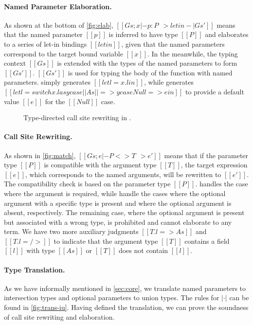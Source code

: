 \paragraph{Named Parameter Elaboration.}
As shown at the bottom of \autoref{fig:elab},
$[[Gs; x |- p : P ~~> letin -| Gs']]$ means that the named parameter
$[[p]]$ is inferred to have type $[[P]]$ and elaborates to a series of let-in
bindings $[[letin]]$, given that the named parameters correspond to the target
bound variable $[[x]]$. In the meanwhile, the typing context $[[Gs]]$ is extended
with the types of the named parameters to form $[[Gs']]$. $[[Gs']]$ is used for
typing the body of the function with named parameters. 
simply generates $[[let l = x.l in]]$, while  generates
$[[let l = switch x.l as y case ||As|| => y case Null => e in]]$ to provide a
default value $[[e]]$ for the $[[Null]]$ case.

\begin{figure}
\IUdefnpmatch{}
\IUdefnlookup{}
\IUdefnlookdown{}
\caption{Type-directed call site rewriting in \uaena.} \label{fig:match}
\end{figure}

\paragraph{Call Site Rewriting.}
As shown in \autoref{fig:match},
$[[Gs; e |- P <> T ~~> e']]$ means that if the parameter type
$[[P]]$ is compatible with the argument type $[[T]]$, the target expression
$[[e]]$, which corresponds to the named arguments, will be rewritten to
$[[e']]$. The compatibility check is based on the parameter type $[[P]]$.
 handles the case where the argument is required, while
 handle the cases where the optional argument
with a specific type is present and where the optional argument is absent,
respectively. The remaining case, where the optional argument is present but
associated with a wrong type, is prohibited and cannot elaborate to any term.
We have two more auxiliary judgments $[[T.l => As]]$ and
$[[T.l =/>]]$ to indicate that the argument type $[[T]]$ contains a field $[[l]]$
with type $[[As]]$ or $[[T]]$ does not contain $[[l]]$.

\paragraph{Type Translation.}
As we have informally mentioned in \autoref{sec:core}, we translate named
parameters to intersection types and optional parameters to union types. The
rules for $|\cdot|$ can be found in \autoref{fig:trans-iu}. Having
defined the translation, we can prove the soundness of call site rewriting and
elaboration.

